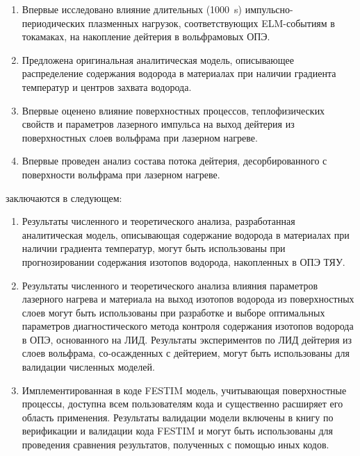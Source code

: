 {\novelty}
\begin{enumerate}[beginpenalty=10000] %
    \item Впервые исследовано влияние длительных (\SI{1000}{\second}) импульсно-периодических плазменных нагрузок, соответствующих ELM-событиям в токамаках,
          на накопление дейтерия в вольфрамовых ОПЭ.
    \item Предложена оригинальная аналитическая модель, описывающее распределение содержания водорода в материалах при наличии градиента температур и центров захвата водорода.
    \item Впервые оценено влияние поверхностных процессов, теплофизических свойств и параметров лазерного импульса на выход дейтерия из поверхностных слоев вольфрама при лазерном нагреве.
    \item Впервые проведен анализ состава потока дейтерия, десорбированного с поверхности вольфрама при лазерном нагреве.
\end{enumerate}

{\influence} заключаются в следующем:
\begin{enumerate}[beginpenalty=10000] %
    \item Результаты численного и теоретического анализа, разработанная аналитическая модель, описывающая содержание водорода в материалах при наличии градиента температур, могут быть использованы при прогнозировании содержания изотопов водорода, накопленных в ОПЭ ТЯУ.
    \item Результаты численного и теоретического анализа влияния параметров лазерного нагрева и материала на выход изотопов водорода из поверхностных слоев могут быть использованы при разработке и выборе оптимальных параметров диагностического метода контроля содержания изотопов водорода в ОПЭ, основанного на ЛИД.      Результаты экспериментов по ЛИД дейтерия из слоев вольфрама, со-осажденных с дейтерием, могут быть использованы для валидации численных моделей.
    \item Имплементированная в коде FESTIM модель, учитывающая поверхностные процессы, доступна всем пользователям кода и существенно расширяет его область применения. Результаты валидации модели включены в книгу по верификации и валидации кода FESTIM и могут быть использованы для проведения сравнения результатов, полученных с помощью иных кодов.
\end{enumerate}

